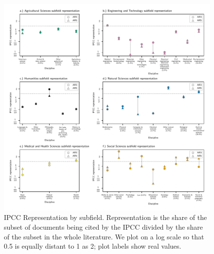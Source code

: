 \documentclass{article}
\begin{document}
\begin{figure}
	\begin{center}
		\includegraphics[width=1\linewidth]{../plots_pub/ipcc_rep_wcs_simplified.pdf}
		\caption{IPCC Representation by subfield. Representation is the share of the subset of documents being cited by the IPCC divided by the share of the subset in the whole literature. We plot on a log scale so that 0.5 is equally distant to 1 as 2; plot labels show real values.}
		\label{subfield}
	\end{center}
\end{figure}
\end{document}
